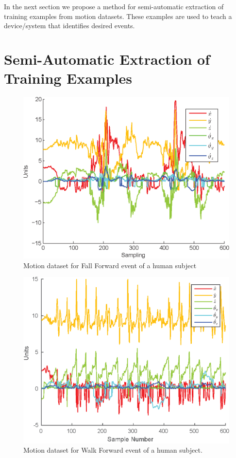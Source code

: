 \documentclass{IEEEtran}
\begin{document}
\par 

In the next section we propose a method for semi-automatic extraction of training examples from motion datasets. These examples are used to teach a device/system that identifies desired events. 

\section{Semi-Automatic Extraction of  Training Examples}
\label{sec:SemiAutomaticExtractionOfTrainingVectors}

\begin{figure}[htb]
	\centering
		\includegraphics[width=0.95\columnwidth]{plots/human_falling-crop.eps}
	\caption{Motion dataset for  Fall Forward event of a human subject}
	\label{fig:human_falling-crop}
\end{figure}

\begin{figure}[htb]
	\centering
		\includegraphics[width=0.95\columnwidth]{plots/human_walk-crop.eps}
	\caption{Motion dataset for Walk Forward event of a human subject. }
	\label{fig:robot_fallen_forward-crop}
\end{figure}
\end{document}
